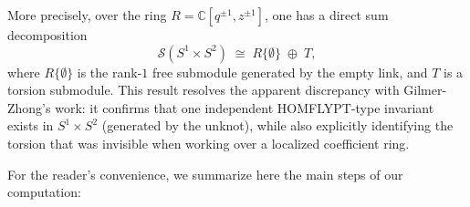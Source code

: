 \documentclass[11pt]{amsart}
\begin{document}
\smallbreak

\noindent More precisely, over the ring $R = \mathbb{C}[q^{\pm1}, z^{\pm1}]$, one has a direct sum decomposition
\[
\mathcal{S}(S^1 \times S^2) \;\cong\; R\{\emptyset\} \;\oplus\; T,
\]
where $R\{\emptyset\}$ is the rank-$1$ free submodule generated by the empty link, and $T$ is a torsion submodule. This result resolves the apparent discrepancy with Gilmer-Zhong’s work: it confirms that one independent HOMFLYPT-type invariant exists in $S^1 \times S^2$ (generated by the unknot), while also explicitly identifying the torsion that was invisible when working over a localized coefficient ring.

\bigbreak

 For the reader’s convenience, we summarize here the main steps of our computation:
\end{document}
